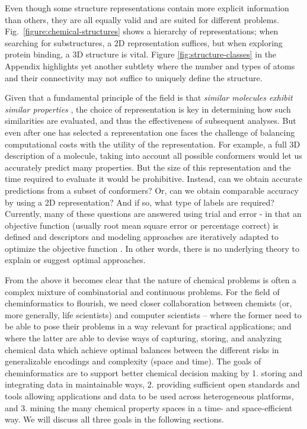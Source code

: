 \documentclass{sig-alternate}
\begin{document}
Even though some structure representations contain more explicit
information than others, they are all equally valid and are suited for
different problems. Fig.~\ref{figure:chemical-structures} shows a
hierarchy of representations; when searching for substructures, a 2D
representation suffices, but when exploring protein binding, a 3D
structure is vital. Figure \ref{fig:structure-classes} in the Appendix
highlights yet another subtlety where the number and types of atoms
and their connectivity may not suffice to uniquely define the
structure.

Given that a fundamental principle of the field is that \emph{similar
molecules exhibit similar properties} \cite{Johnson:1990qf}, the
choice of representation is key in determining how such similarities
are evaluated, and thus the effectiveness of subsequent analyses. But
even after one has selected a representation one faces the challenge
of balancing computational costs with the utility of the
representation. For example, a full 3D description of a molecule,
taking into account all possible conformers would let us accurately
predict many properties. But the size of this representation and the
time required to evaluate it would be prohibitive. Instead, can we
obtain accurate predictions from a subset of conformers? Or, can we
obtain comparable accuracy by using a 2D representation? And if so,
what type of labels are required? Currently, many of these questions
are answered using trial and error - in that an objective function
(usually root mean square error or percentage correct) is defined and
descriptors and modeling approaches are iteratively adapted to
optimize the objective function . In other words, there is no
underlying theory to explain or suggest optimal approaches.

From the above it becomes clear that the nature of chemical problems
is often a complex mixture of combinatorial and continuous problems.
For the field of cheminformatics to flourish, we need closer
collaboration between chemists (or, more generally, life scientists)
and computer scientists -- where the former need to be able to pose
their problems in a way relevant for practical applications; and where
the latter are able to devise ways of capturing, storing, and
analyzing chemical data which achieve optimal balances between the
different risks in generalizable encodings and complexity (space and
time). The goals of cheminformatics are to support better chemical
decision making by 1. storing and integrating data in maintainable
ways, 2.  providing sufficient open standards and tools allowing
applications and data to be used across heterogeneous platforms, and
3. mining the many chemical property spaces in a time- and
space-efficient way. We will discuss all three goals in the following
sections.
\end{document}
